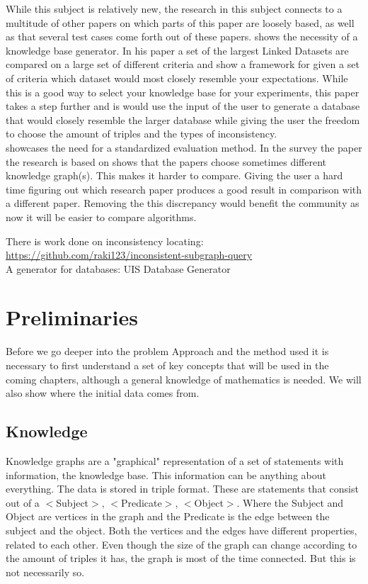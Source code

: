 \documentclass{article}
\begin{document}
While this subject is relatively new, the research in this subject connects to a multitude of other papers on which parts of this paper are loosely based, as well as that several test cases come forth out of these papers. \cite{MichaelF:2017} shows the necessity of a knowledge base generator. In his paper a set of the largest Linked Datasets are compared on a large set of different criteria and show a framework for given a set of criteria which dataset would most closely resemble your expectations. While this is a good way to select your knowledge base for your experiments, this paper takes a step further and is would use the input of the user to generate a database that would closely resemble the larger database while giving the user the freedom to choose the amount of triples and the types of inconsistency.\\
\cite{HeikoP:2016} showcases the need for a standardized evaluation method. In the survey the paper the research is based on shows that the papers choose sometimes different knowledge graph(s). This makes it harder to compare. Giving the user a hard time figuring out which research paper produces a good result in comparison with a different paper. Removing the this discrepancy would benefit the community as now it will be easier to compare algorithms.

There is work done on inconsistency locating: \url{https://github.com/raki123/inconsistent-subgraph-query}\\
A generator for databases: UIS Database Generator\\


\newpage
\section{Preliminaries}
Before we go deeper into the problem Approach and the method used it is necessary to first understand a set of key concepts that will be used in the coming chapters, although a general knowledge of mathematics is needed. We will also show where the initial data comes from.

\subsection{Knowledge}
Knowledge graphs are a "graphical" representation of a set of statements with information, the knowledge base. This information can be anything about everything. The data is stored in triple format. These are statements that consist out of a $<$Subject$>$, $<$Predicate$>$, $<$Object$>$. Where the Subject and Object are vertices in the graph and the Predicate is the edge between the subject and the object. Both the vertices and the edges have different properties, related to each other. Even though the size of the graph can change according to the amount of triples it has, the graph is most of the time connected. But this is not necessarily so. \\
\end{document}
